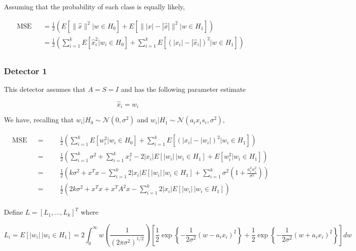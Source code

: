 \documentclass[english]{article}
\begin{document}
Assuming that the probability of each class is equally likely,

\begin{equation}
\begin{aligned}
&\text{MSE}
&&=\frac{1}{2}\left(E[\|\hat{x}\|^2|w\in H_0] + E[\||x|-|\hat{x}|\|^2| w\in H_1]\right)\\
&&&=\frac{1}{2}\left(\sum_{i=1}^kE[\hat{x}_i^2|w_i\in H_0] + \sum_{i=1}^kE[\left(|x_i|-|\hat{x}_i|\right)^2| w\in H_1]\right)\\
\end{aligned}
\end{equation}

\subsubsection{Detector 1}
This detector assumes that $A=S=I$ and has the following parameter estimate

\begin{equation}
\hat{x}_i = w_i
\end{equation}

We have, recalling that $w_i|H_0\sim\mathcal{N}(0,\sigma^2)$ and $w_i|H_1\sim\mathcal{N}(a_ix_is_i,\sigma^2)$,

\begin{equation}
\begin{aligned}
&\text{MSE}
&&=
&&&\frac{1}{2}\left(\sum_{i=1}^kE[w_i^2|w_i\in H_0] + \sum_{i=1}^kE[\left(|x_i|-|w_i|\right)^2| w_i\in H_1]\right)\\
&&&=
&&&\frac{1}{2}\left(\sum_{i=1}^k\sigma^2 +\sum_{i=1}^kx_i^2-2|x_i|E[|w_i|\,| w_i\in H_1] +E[w_i^2|w_i\in H_1]\right)\\
&&&=
&&&\frac{1}{2}\left(k\sigma^2 +x^Tx - \sum_{i=1}^k2|x_i|E[|w_i|\,| w_i\in H_1] + \sum_{i=1}^k\sigma^2\left(1+\frac{a_i^2x_i^2}{\sigma^2}\right) \right)\\
&&&=
&&&\frac{1}{2}\left(2k\sigma^2 +x^Tx +x^TA^2x - \sum_{i=1}^k2|x_i|E[|w_i|\,| w_i\in H_1]\right)\\
\end{aligned}
\end{equation}

Define $L=[L_1,\dots,L_k]^T$ where

\begin{equation}
L_i = E[|w_i|\,|w_i\in H_1] = 2\int_0^\infty w\left(\frac{1}{(2\pi\sigma^2)^{1/2}}\right)\left[\frac{1}{2}\exp\left\{-\frac{1}{2\sigma^2}\left(w-a_ix_i\right)^2\right\}+\frac{1}{2}\exp\left\{-\frac{1}{2\sigma^2}\left(w+a_ix_i\right)^2\right\}\right]dw
\end{equation}
\end{document}
